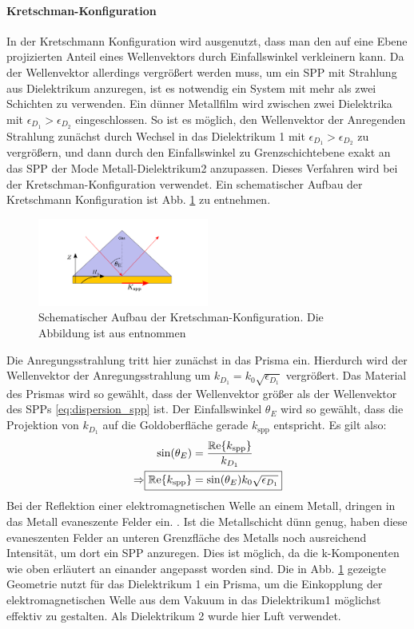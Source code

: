 \documentclass{article}
\begin{document}
			\paragraph{Kretschman-Konfiguration}
			In der Kretschmann Konfiguration wird ausgenutzt, dass man den auf eine Ebene projizierten Anteil eines Wellenvektors durch Einfallswinkel verkleinern kann. Da der Wellenvektor allerdings vergrößert werden muss, um ein SPP mit Strahlung aus Dielektrikum anzuregen, ist es notwendig ein System mit mehr als zwei Schichten zu verwenden. Ein dünner Metallfilm wird zwischen zwei Dielektrika mit $\epsilon_{D_1} > \epsilon_{D_2}$ eingeschlossen. So ist es möglich, den Wellenvektor der Anregenden Strahlung zunächst durch Wechsel in das Dielektrikum 1 mit $\epsilon_{D_1} > \epsilon_{D_2}$ zu vergrößern, und dann durch den Einfallswinkel zu Grenzschichtebene exakt an das SPP der Mode Metall-Dielektrikum2 anzupassen. Dieses Verfahren wird bei der Kretschman-Konfiguration verwendet. Ein schematischer Aufbau der Kretschmann Konfiguration ist Abb. \ref{fig:kretschman} zu entnehmen.
				\begin{figure}[h] 
				\centering
				\includegraphics[width=0.5\textwidth]{figures/Kretschmann.pdf}
				\caption{Schematischer Aufbau der Kretschman-Konfiguration. Die Abbildung ist aus \cite{Jaruschewski.2020} entnommen}
				\label{fig:kretschman}
				\end{figure}
			Die Anregungsstrahlung tritt hier zunächst in das Prisma ein. Hierdurch wird der Wellenvektor der Anregungsstrahlung um $k_{D_1}=k_0\sqrt{\epsilon_{D_1}}$ vergrößert. Das Material des Prismas wird so gewählt, dass der Wellenvektor größer als der Wellenvektor des SPPs \eqref{eq:dispersion_spp} ist. Der Einfallswinkel $\theta_E$ wird so gewählt, dass die Projektion von $k_{D_1}$ auf die Goldoberfläche gerade $k_{\mathrm{spp}}$ entspricht. Es gilt also:
			\begin{align}
				\label{eq:phase_condition}
				\sin(\theta_E) &= \dfrac{\operatorname{\mathbb{R}e}\{k_{\mathrm{spp}}\}}{k_{D_1}}\\
				\Rightarrow \Aboxed{\operatorname{\mathbb{R}e}\{k_{\mathrm{spp}}\} &= \sin(\theta_E) k_0 \sqrt{\epsilon_{D_1}}}
			\end{align}
			Bei der Reflektion einer elektromagnetischen Welle an einem Metall, dringen in das Metall evaneszente Felder ein. \cite{Novotny.2012b}. Ist die Metallschicht dünn genug, haben diese evaneszenten Felder an unteren Grenzfläche des Metalls noch ausreichend Intensität, um dort ein SPP anzuregen. Dies ist möglich, da die k-Komponenten wie oben erläutert an einander angepasst worden sind. Die in Abb. \ref{fig:kretschman} gezeigte Geometrie nutzt für das Dielektrikum 1 ein Prisma, um die Einkopplung der elektromagnetischen Welle aus dem Vakuum in das Dielektrikum1 möglichst effektiv zu gestalten. Als Dielektrikum 2 wurde hier Luft verwendet.			
		
\end{document}
